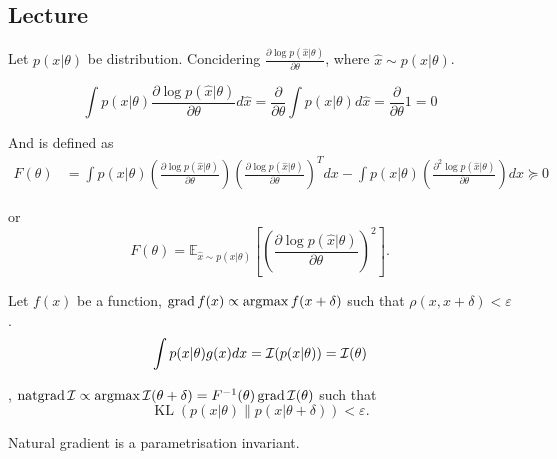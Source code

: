 \subsection{Lecture}

\begin{edefn}
    Let $p(x \vert \theta)$ be distribution. Concidering $\frac{\partial \log p(\hat{x} | \theta)}{\partial \theta}$, where $\hat{x} \sim p(x | \theta)$. 
    
    \begin{equation*}
        \int p(x | \theta) \frac{\partial \log p(\hat{x} | \theta)}{\partial \theta} d\hat{x} = \frac{\partial}{\partial \theta} \int p(x | \theta) d\hat{x} = \frac{\partial}{\partial \theta} 1 = 0
    \end{equation*}

    And  is defined as
    \begin{equation*}
        \begin{aligned}
            F(\theta) &= \int p(x | \theta) \left( \frac{\partial \log p(\hat{x} | \theta)}{\partial \theta} \right) \left( \frac{\partial \log p(\hat{x} | \theta)}{\partial \theta} \right)^T dx -\int p(x | \theta) \left( \frac{\partial^2 \log p(\hat{x} | \theta)}{\partial \theta} \right) dx \succeq 0
        \end{aligned}
    \end{equation*}

    or
    \begin{equation*}
        F(\theta) = \mathbb{E}_{\hat{x} \sim p(x | \theta)} \left[ \left( \frac{\partial \log p(\hat{x} | \theta)}{\partial \theta} \right)^2 \right].
    \end{equation*}
\end{edefn}

Let $f(x)$ be a function, $\operatorname{grad} f(x) \propto \operatorname{argmax} f(x + \delta)$ such that $\rho(x, x+ \delta) < \varepsilon$.  $$\int p(x | \theta) g(x) dx = \operatorname{\mathcal{I}}(p(x | \theta)) = \operatorname{\mathcal{I}}(\theta)$$

\begin{edefn}
    , $\operatorname{natgrad} \operatorname{\mathcal{I}} \propto \operatorname{argmax} \operatorname{\mathcal{I}}(\theta + \delta) = F^{-1}(\theta) \operatorname{grad} \operatorname{\mathcal{I}} (\theta)$ such that $$\operatorname{KL} \left( p(x | \theta) \parallel p(x | \theta + \delta)\right) < \varepsilon.$$  
\end{edefn}

\begin{eremark}
    Natural gradient is a parametrisation invariant.
\end{eremark}


